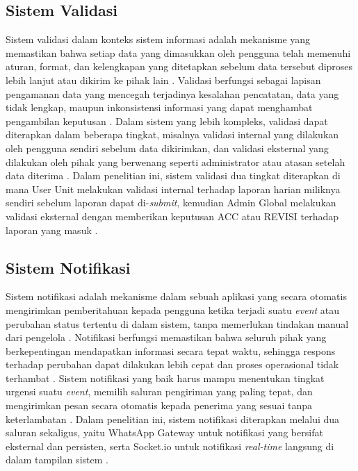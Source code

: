 \subsection{Sistem Validasi} \label{II.Validasi}
Sistem validasi dalam konteks sistem informasi adalah mekanisme yang memastikan bahwa setiap data yang dimasukkan oleh pengguna telah memenuhi aturan, format, dan kelengkapan yang ditetapkan sebelum data tersebut diproses lebih lanjut atau dikirim ke pihak lain \cite{zikra2025webinfo}. Validasi berfungsi sebagai lapisan pengamanan data yang mencegah terjadinya kesalahan pencatatan, data yang tidak lengkap, maupun inkonsistensi informasi yang dapat menghambat pengambilan keputusan \cite{cahyo2026mbg}. Dalam sistem yang lebih kompleks, validasi dapat diterapkan dalam beberapa tingkat, misalnya validasi internal yang dilakukan oleh pengguna sendiri sebelum data dikirimkan, dan validasi eksternal yang dilakukan oleh pihak yang berwenang seperti administrator atau atasan setelah data diterima \cite{nugroho2025monitoring}. Dalam penelitian ini, sistem validasi dua tingkat diterapkan di mana User Unit melakukan validasi internal terhadap laporan harian miliknya sendiri sebelum laporan dapat di-\textit{submit}, kemudian Admin Global melakukan validasi eksternal dengan memberikan keputusan ACC atau REVISI terhadap laporan yang masuk \cite{nugroho2025monitoring}. \par

\subsection{Sistem Notifikasi} \label{II.Notifikasi}
Sistem notifikasi adalah mekanisme dalam sebuah aplikasi yang secara otomatis mengirimkan pemberitahuan kepada pengguna ketika terjadi suatu \textit{event} atau perubahan status tertentu di dalam sistem, tanpa memerlukan tindakan manual dari pengelola \cite{alfan2026notifikasi}. Notifikasi berfungsi memastikan bahwa seluruh pihak yang berkepentingan mendapatkan informasi secara tepat waktu, sehingga respons terhadap perubahan dapat dilakukan lebih cepat dan proses operasional tidak terhambat \cite{alfan2026notifikasi}. Sistem notifikasi yang baik harus mampu menentukan tingkat urgensi suatu \textit{event}, memilih saluran pengiriman yang paling tepat, dan mengirimkan pesan secara otomatis kepada penerima yang sesuai tanpa keterlambatan \cite{alfan2026notifikasi}. Dalam penelitian ini, sistem notifikasi diterapkan melalui dua saluran sekaligus, yaitu WhatsApp Gateway untuk notifikasi yang bersifat eksternal dan persisten, serta Socket.io untuk notifikasi \textit{real-time} langsung di dalam tampilan sistem \cite{dani2026pelaporan}. \par

